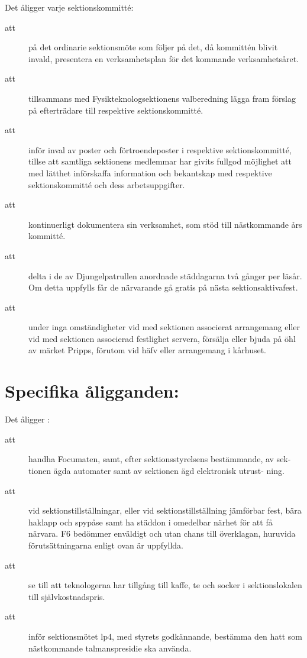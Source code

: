 Det åligger varje sektionskommitté:
\begin{description}
    \item[att] på det ordinarie sektionsmöte som följer på det, då kommittén blivit invald, presentera en verksamhetsplan för det kommande verksamhetsåret.
      \item[att] tillsammans med Fysikteknologsektionens valberedning lägga fram förslag på efterträdare till respektive sektionskommitté.
      \item[att] inför inval av poster och förtroendeposter i respektive sektionskommitté, tillse att samtliga sektionens medlemmar har givits fullgod möjlighet att med lätthet införskaffa information och bekantskap med respektive sektionskommitté och dess arbetsuppgifter.
      \item[att] kontinuerligt dokumentera sin verksamhet, som stöd till näst\-komm\-ande års kommitté.
      \item[att] delta i de av Djungelpatrullen anordnade städdagarna två gånger per
      läsår. Om detta uppfylls får de närvarande gå gratis på nästa
      sektionsaktivafest.
      \item[att] under inga omständigheter vid med sektionen associerat arrangemang eller vid med sektionen associerad festlighet servera, försälja eller bjuda på öhl av märket Pripps, förutom vid häfv eller arrangemang i kårhuset.
      
    \end{description}

\section{Specifika åligganden:}

Det åligger \forening :
\begin{description}
\item[att] handha Focumaten, samt, efter sektionsstyrelsens bestämmande, av sek-
tionen ägda automater samt av sektionen ägd elektronisk utrust-
ning.

\item[att] vid sektionstillställningar, eller vid sektionstillställning jämförbar fest, bära haklapp och spypåse samt ha städdon i omedelbar närhet för att få närvara. F6 bedömmer enväldigt och utan chans till överklagan, huruvida förutsättningarna enligt ovan är uppfyllda.
 
\item[att] se till att teknologerna har tillgång till kaffe, te och socker i sektionslokalen till självkostnadspris.

\item[att] inför sektionsmötet lp4, med styrets godkännande, bestämma den hatt som nästkommande talmanspresidie ska använda.

\end{description}

